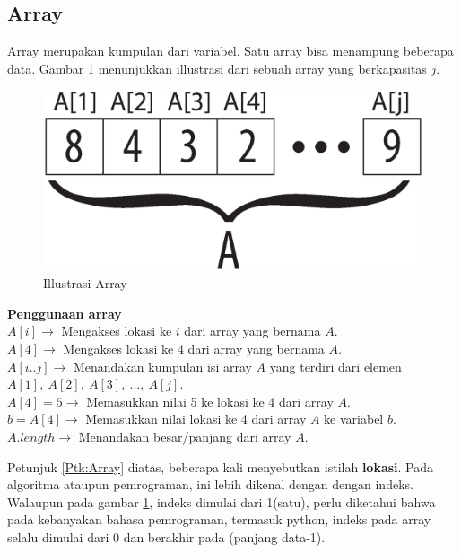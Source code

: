 \begin{enumerate}
\subsection{Array}
Array merupakan kumpulan dari variabel. Satu array bisa menampung beberapa data. Gambar \ref{fig:illustrasiArray} menunjukkan illustrasi dari sebuah array yang berkapasitas $j$. 
\begin{center}
	\begin{figure}[h!]%
		\includegraphics[scale=0.4]{fig/Array.eps}%
		\caption{Illustrasi Array}%
		\label{fig:illustrasiArray}%
	\end{figure}
\end{center}
\begin{Petunjuk}
\label{Ptk:Array}
	\textbf{Penggunaan array}\\
	$A[i] \rightarrow$ Mengakses lokasi ke $i$ dari array yang bernama $A$.\\
	$A[4] \rightarrow$ Mengakses lokasi ke $4$ dari array yang bernama $A$.\\
	$A[i..j] \rightarrow$ Menandakan kumpulan isi array $A$ yang terdiri dari elemen $A[1],\ A[2],\ A[3],\ \ldots,\ A[j]$.\\
	$A[4] = 5 \rightarrow$ Memasukkan nilai 5 ke lokasi ke 4 dari array $A$.\\
	$b = A[4] \rightarrow$ Memasukkan nilai lokasi ke 4 dari array $A$ ke variabel $b$. 
	$A.length \rightarrow$ Menandakan besar/panjang dari array $A$.
	
	
\end{Petunjuk}
	

Petunjuk \ref{Ptk:Array} diatas, beberapa kali menyebutkan istilah \textbf{lokasi}. Pada algoritma ataupun pemrograman, ini lebih dikenal dengan dengan indeks. Walaupun pada gambar \ref{fig:illustrasiArray}, indeks dimulai dari 1(satu), perlu diketahui bahwa pada kebanyakan bahasa pemrograman, termasuk python, indeks pada array selalu dimulai dari 0 dan berakhir pada (panjang data-1). \\


\end{enumerate}

